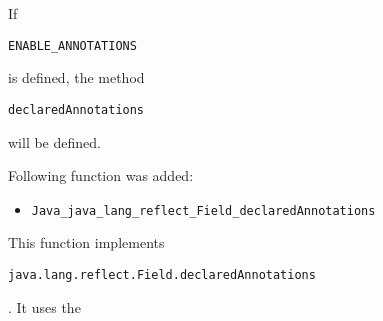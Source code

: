 \documentclass[a4paper, 10pt, titlepage]{scrartcl} %
\begin{document}
If \begin{scriptsize}\verb|ENABLE_ANNOTATIONS|\end{scriptsize} is defined, the method
\begin{scriptsize}\verb|declaredAnnotations|\end{scriptsize} will be defined.

Following function was added:
\begin{itemize}
 \item \begin{scriptsize}\verb|Java_java_lang_reflect_Field_declaredAnnotations|\end{scriptsize}
\end{itemize}
This function implements
\begin{scriptsize}\verb|java|\hspace{0.0pt}\verb|.|\hspace{0.0pt}\verb|lang|\hspace{0.0pt}\verb|.|\hspace{0.0pt}\verb|reflect|\hspace{0.0pt}\verb|.|\hspace{0.0pt}\verb|Field|\hspace{0.0pt}\verb|.|\hspace{0.0pt}\verb|declaredAnnotations|\end{scriptsize}. It uses the
\end{document}
